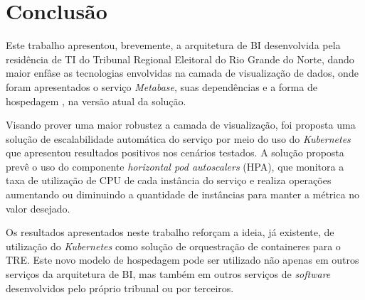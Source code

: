 \section{Conclusão}

Este trabalho apresentou, brevemente, a arquitetura de BI desenvolvida pela residência de TI do Tribunal Regional Eleitoral do Rio Grande do Norte, dando maior enfâse as tecnologias envolvidas na camada de visualização de dados, onde foram apresentados o serviço \textit{Metabase}, suas dependências e a forma de hospedagem , na versão atual da solução.

Visando prover uma maior robustez a camada de visualização, foi proposta uma solução de escalabilidade automática do serviço por meio do uso do \textit{Kubernetes} que apresentou resultados positivos nos cenários testados. A solução proposta prevê o uso do componente \textit{horizontal pod autoscalers} (HPA), que monitora a taxa de utilização de CPU de cada instância do serviço e realiza operações aumentando ou diminuindo a quantidade de instâncias para manter a métrica no valor desejado.

Os resultados apresentados neste trabalho reforçam a ideia, já existente, de utilização do \textit{Kubernetes} como solução de orquestração de containeres para o TRE. Este novo modelo de hospedagem pode ser utilizado não apenas em outros serviços da arquitetura de BI, mas também em outros serviços de \textit{software} desenvolvidos pelo próprio tribunal ou por terceiros. 